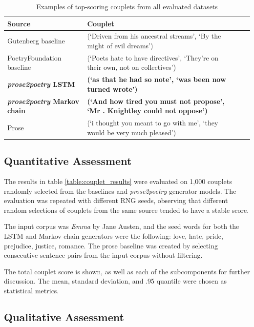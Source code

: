 \documentclass[11pt,a4paper]{article}
\begin{document}
\begin{table}[ht]
\begin{tabular*}{\textwidth}{ll cc}
	\hline\hline
	Source & Couplet \\ [0.5ex]
	\hline\hline
	Gutenberg baseline & (`Driven from his ancestral streams', `By the might of evil dreams') \\ [0.5ex]
	\hline
	PoetryFoundation baseline & (`Poets hate to have directives', `They’re on their own, not on collectives') \\ [0.5ex]
	\hline
	\textbf{\textit{prose2poetry} LSTM} & \textbf{(`as that he had so note', `was been now turned wrote')} \\ [0.5ex]
	\hline
	\textbf{\textit{prose2poetry} Markov chain} & \textbf{(`And how tired you must not propose', `Mr . Knightley could not oppose')} \\ [0.5ex]
	\hline
	Prose & (`i thought you meant to go with me', `they would be very much pleased') \\ [0.5ex]
	\hline
\end{tabular*}
\caption{Examples of top-scoring couplets from all evaluated datasets}
\label{table:bestcouplets}
\end{table}

\subsection{Quantitative Assessment}

The results in table \ref{table:couplet_results} were evaluated on 1,000 couplets randomly selected from the baselines and \textit{prose2poetry} generator models. The evaluation was repeated with different RNG seeds, observing that different random selections of couplets from the same source tended to have a stable score.

The input corpus was \textit{Emma} by Jane Austen, and the seed words for both the LSTM and Markov chain generators were the following: love, hate, pride, prejudice, justice, romance. The prose baseline was created by selecting consecutive sentence pairs from the input corpus without filtering.

The total couplet score is shown, as well as each of the subcomponents for further discussion. The mean, standard deviation, and .95 quantile were chosen as statistical metrics.

\subsection{Qualitative Assessment}
\end{document}

